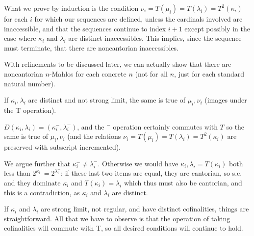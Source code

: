 \documentclass{slides}
\begin{document}
\begin{slide}

What we prove by induction is the condition $\nu_i = T(\mu_i) = T(\lambda_i) = T^2(\kappa_i)$ for each $i$ for which our sequences are defined, unless the cardinals involved are inaccessible, and that the sequences continue to index $i+1$ except possibly in the case where $\kappa_i$ and $\lambda_i$ are distinct inaccessibles.  This implies, since the sequence must terminate, that there are noncantorian inaccessibles.

With refinements to be discussed later, we can actually show that there are noncantorian $n$-Mahlos for each concrete $n$  (not for all $n$, just for each standard natural number).


\end{slide}

\begin{slide}

If $\kappa_i, \lambda_i$ are distinct and not strong limit, the same is true of $\mu_i, \nu_i$ (images under the T operation).

$D(\kappa_i,\lambda_i) = (\kappa_i^-,\lambda_i^-)$, and the $^-$ operation certainly commutes with $T$ so the same is true of $\mu_i, \nu_i$ (and the relations $\nu_i = T(\mu_i) = T(\lambda_i) = T^2(\kappa_i)$ are preserved with subscript incremented).

We argue further that $\kappa_i^- \neq \lambda_i^-$.  Otherwise we would have $\kappa_i, \lambda_i=T(\kappa_i)$ both less than $2^{\kappa_i^-} = 2^{\lambda_i^-}$:  if these last two items are equal, they are cantorian, so s.c. and they dominate $\kappa_i$ and $T(\kappa_i)=\lambda_i$ which thus must also be cantorian, and this is a contradiction, 
as $\kappa_i$ and $\lambda_i$ are distinct.

\end{slide}

\begin{slide}

If $\kappa_i$ and $\lambda_i$ are strong limit, not regular, and have distinct cofinalities, things are straightforward.  All that we have to observe is that
the operation of taking cofinalities will commute with T, so all desired conditions will continue to hold.


\end{slide}
\end{document}
